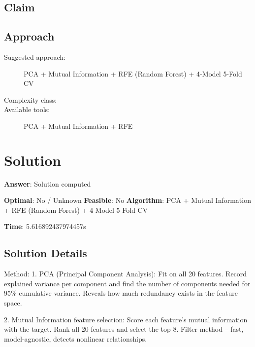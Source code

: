\documentclass[11pt, a4paper]{article}
\begin{document}
\subsection{Claim}


\subsection{Approach}

\begin{description}
  \item[Suggested approach:] PCA + Mutual Information + RFE (Random Forest) + 4-Model 5-Fold CV
  \item[Complexity class:] 
  \item[Available tools:] PCA + Mutual Information + RFE
\end{description}
\section{Solution}

\begin{polyaresult}

\textbf{Answer}: Solution computed


\textbf{Optimal}: No / Unknown \hfill
\textbf{Feasible}: No
\textbf{Algorithm}: PCA + Mutual Information + RFE (Random Forest) + 4-Model 5-Fold CV \quad $$

\textbf{Time}: 5.616892437974457s


\end{polyaresult}

\subsection{Solution Details}


Method: 1. PCA (Principal Component Analysis): Fit on all 20 features. Record explained variance per component and find the number of components needed for 95\% cumulative variance. Reveals how much redundancy exists in the feature space.

2. Mutual Information feature selection: Score each feature's mutual information with the target. Rank all 20 features and select the top 8. Filter method -- fast, model-agnostic, detects nonlinear relationships.
\end{document}
